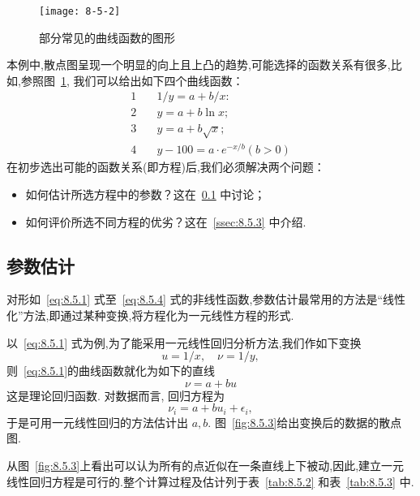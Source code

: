 \begin{example}
    \begin{figure}[p]
    \centering
    \texttt{[image: 8-5-2]}
    \caption{部分常见的曲线函数的图形}
    \label{fig:8.5.2}
    \end{figure}
    
    本例中,散点图呈现一个明显的向上且上凸的趋势,可能选择的函数关系有很多,比如,参照图~\ref{fig:8.5.2}, 我们可以给出如下四个曲线函数：
    \begin{align}
    1 &\quad 1 / y=a+b / x : \label{eq:8.5.1} \\ 
    2  &\quad  y=a+b \ln x ;  \label{eq:8.5.2}\\ 
    3  &\quad  y=a+b \sqrt{x} ; \label{eq:8.5.3} \\ 
    4  &\quad  y-100=a \cdot e^{-x / b}(b>0)\label{eq:8.5.4}
    \end{align}
    在初步选出可能的函数关系(即方程)后,我们必须解决两个问题：
    \begin{itemize}
        \item 如何估计所选方程中的参数？这在~\ref{ssec:8.5.2} 中讨论；
        \item 如何评价所选不同方程的优劣？这在~\ref{ssec:8.5.3} 中介绍.
    \end{itemize}
\end{example}

\subsection{参数估计}\label{ssec:8.5.2}

对形如~\eqref{eq:8.5.1} 式至~\eqref{eq:8.5.4} 式的非线性函数,参数估计最常用的方法是“线性化”方法,即通过某种变换,将方程化为一元线性方程的形式.

以~\eqref{eq:8.5.1} 式为例,为了能采用一元线性回归分析方法,我们作如下变换 
\begin{equation*}
  u =1/x, \quad \nu =1/y, 
\end{equation*}
则~\eqref{eq:8.5.1}的曲线函数就化为如下的直线 
\begin{equation*}
  \nu = a + bu
\end{equation*}
这是理论回归函数. 对数据而言, 回归方程为
\begin{equation*}
\nu_i=a+b u_i+\epsilon_i,
\end{equation*}
于是可用一元线性回归的方法估计出 $a,b$. 图~\ref{fig:8.5.3}给出变换后的数据的散点图.

从图~\ref{fig:8.5.3}上看出可以认为所有的点近似在一条直线上下被动,因此,建立一元线性回归方程是可行的.整个计算过程及估计列于表~\ref{tab:8.5.2} 和表~\ref{tab:8.5.3} 中.


